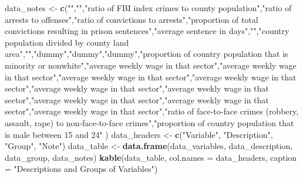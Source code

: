 \documentclass[
]{article}
\newenvironment{Shaded}{\begin{snugshade}}{\end{snugshade}}
\newcommand{\DataTypeTok}[1]{\textcolor[rgb]{0.13,0.29,0.53}{#1}}
\newcommand{\KeywordTok}[1]{\textcolor[rgb]{0.13,0.29,0.53}{\textbf{#1}}}
\newcommand{\NormalTok}[1]{#1}
\newcommand{\StringTok}[1]{\textcolor[rgb]{0.31,0.60,0.02}{#1}}
\begin{document}
\begin{Shaded}
\begin{Highlighting}[]
\NormalTok{data_notes <-}\StringTok{ }\KeywordTok{c}\NormalTok{(}\StringTok{""}\NormalTok{,}\StringTok{""}\NormalTok{,}\StringTok{"ratio of FBI index crimes to county population"}\NormalTok{,}\StringTok{"ratio of arrests to offenses"}\NormalTok{,}\StringTok{"ratio of convictions to arrests"}\NormalTok{,}\StringTok{"proportion of total convictions resulting in prison sentences"}\NormalTok{,}\StringTok{"average sentence in days"}\NormalTok{,}\StringTok{""}\NormalTok{,}\StringTok{"country population divided by county land area"}\NormalTok{,}\StringTok{""}\NormalTok{,}\StringTok{"dummy"}\NormalTok{,}\StringTok{"dummy"}\NormalTok{,}\StringTok{"dummy"}\NormalTok{,}\StringTok{"proportion of country population that is minority or nonwhite"}\NormalTok{,}\StringTok{"average weekly wage in that sector"}\NormalTok{,}\StringTok{"average weekly wage in that sector"}\NormalTok{,}\StringTok{"average weekly wage in that sector"}\NormalTok{,}\StringTok{"average weekly wage in that sector"}\NormalTok{,}\StringTok{"average weekly wage in that sector"}\NormalTok{,}\StringTok{"average weekly wage in that sector"}\NormalTok{,}\StringTok{"average weekly wage in that sector"}\NormalTok{,}\StringTok{"average weekly wage in that sector"}\NormalTok{,}\StringTok{"average weekly wage in that sector"}\NormalTok{,}\StringTok{"ratio of face-to-face crimes (robbery, assault, rape) to non-face-to-face crimes"}\NormalTok{,}\StringTok{"proportion of country population that is male between 15 and 24"}
\NormalTok{)}
\NormalTok{data_headers <-}\StringTok{ }\KeywordTok{c}\NormalTok{(}\StringTok{"Variable"}\NormalTok{, }\StringTok{"Description"}\NormalTok{, }\StringTok{"Group"}\NormalTok{, }\StringTok{"Note"}\NormalTok{)}
\NormalTok{data_table <-}\StringTok{ }\KeywordTok{data.frame}\NormalTok{(data_variables, data_description, data_group, data_notes)}
\KeywordTok{kable}\NormalTok{(data_table, }\DataTypeTok{col.names =}\NormalTok{ data_headers, }\DataTypeTok{caption =} \StringTok{"Descriptions and Groups of Variables"}\NormalTok{)}
\end{Highlighting}
\end{Shaded}
\end{document}
